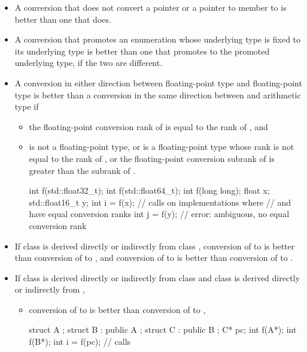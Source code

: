 \begin{itemize}
\item
A conversion that does not convert a pointer or a pointer to member
to
is better than one that does.

\item
A conversion that promotes an enumeration whose underlying type is fixed to its underlying
type is better than one that promotes to the promoted underlying type, if the two are
different.
\item
A conversion in either direction
between floating-point type  and floating-point type 
is better than a conversion in the same direction
between  and arithmetic type  if
\begin{itemize}
\item
the floating-point conversion rank of 
is equal to the rank of , and
\item
{} is not a floating-point type, or
 is a floating-point type
whose rank is not equal to the rank of , or
the floating-point conversion subrank of 
is greater than the subrank of .
\begin{example}
\begin{codeblock}
int f(std::float32_t);
int f(std::float64_t);
int f(long long);
float x;
std::float16_t y;
int i = f(x);           // calls  on implementations where
                        //  and  have equal conversion ranks
int j = f(y);           // error: ambiguous, no equal conversion rank
\end{codeblock}
\end{example}
\end{itemize}

\item
If class
is derived directly or indirectly from class
,
conversion of
to
is better than conversion of
to
,
and conversion of
to
is better than conversion
of
to
.
\item
If class
is derived directly or indirectly from class
and class
is derived directly or indirectly from
,
\begin{itemize}
\item
conversion of
to
is better than conversion of
to
,
\begin{example}
\begin{codeblock}
struct A {};
struct B : public A {};
struct C : public B {};
C* pc;
int f(A*);
int f(B*);
int i = f(pc);                  // calls 
\end{codeblock}
\end{example}


\end{itemize}
\end{itemize}

